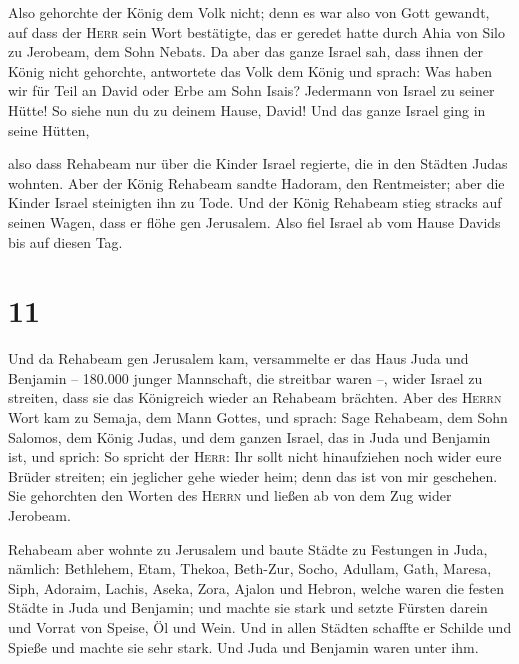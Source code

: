  Also gehorchte der König dem Volk nicht; denn es war
also von Gott gewandt, auf dass der \textsc{Herr} sein Wort bestätigte,
das er geredet hatte durch Ahia von Silo zu Jerobeam, dem Sohn Nebats.
 Da aber das ganze Israel sah, dass ihnen der König nicht
gehorchte, antwortete das Volk dem König und sprach: Was haben wir für
Teil an David oder Erbe am Sohn Isais? Jedermann von Israel zu seiner
Hütte! So siehe nun du zu deinem Hause, David! Und das ganze Israel ging
in seine Hütten,

 also dass Rehabeam nur über die Kinder Israel regierte,
die in den Städten Judas wohnten.  Aber der König
Rehabeam sandte Hadoram, den Rentmeister; aber die Kinder Israel
steinigten ihn zu Tode. Und der König Rehabeam stieg stracks auf seinen
Wagen, dass er flöhe gen Jerusalem.  Also fiel Israel ab
vom Hause Davids bis auf diesen Tag.

\hypertarget{section-10}{%
\section{11}\label{section-10}}

 Und da Rehabeam gen Jerusalem kam, versammelte er das
Haus Juda und Benjamin -- 180.000 junger Mannschaft, die streitbar waren
--, wider Israel zu streiten, dass sie das Königreich wieder an Rehabeam
brächten.  Aber des \textsc{Herrn} Wort kam zu Semaja, dem
Mann Gottes, und sprach:  Sage Rehabeam, dem Sohn Salomos,
dem König Judas, und dem ganzen Israel, das in Juda und Benjamin ist,
und sprich:  So spricht der \textsc{Herr}: Ihr sollt nicht
hinaufziehen noch wider eure Brüder streiten; ein jeglicher gehe wieder
heim; denn das ist von mir geschehen. Sie gehorchten den Worten des
\textsc{Herrn} und ließen ab von dem Zug wider Jerobeam.

 Rehabeam aber wohnte zu Jerusalem und baute Städte zu
Festungen in Juda,  nämlich: Bethlehem, Etam, Thekoa,
 Beth-Zur, Socho, Adullam,  Gath, Maresa,
Siph,  Adoraim, Lachis, Aseka,  Zora,
Ajalon und Hebron, welche waren die festen Städte in Juda und Benjamin;
 und machte sie stark und setzte Fürsten darein und
Vorrat von Speise, Öl und Wein.  Und in allen Städten
schaffte er Schilde und Spieße und machte sie sehr stark. Und Juda und
Benjamin waren unter ihm.


